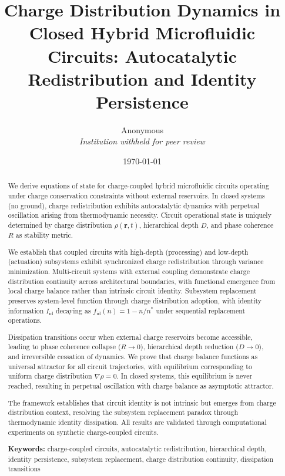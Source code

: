 \documentclass[12pt,a4paper]{article}
\title{\textbf{Charge Distribution Dynamics in Closed Hybrid Microfluidic Circuits: Autocatalytic Redistribution and Identity Persistence}}
\author{
Anonymous\\
\textit{Institution withheld for peer review}
}
\date{\today}
\theoremstyle{plain}
\theoremstyle{definition}
\theoremstyle{remark}
\begin{document}
\maketitle

\begin{abstract}
We derive equations of state for charge-coupled hybrid microfluidic circuits operating under charge conservation constraints without external reservoirs. In closed systems (no ground), charge redistribution exhibits autocatalytic dynamics with perpetual oscillation arising from thermodynamic necessity. Circuit operational state is uniquely determined by charge distribution $\rho(\mathbf{r},t)$, hierarchical depth $D$, and phase coherence $R$ as stability metric.

We establish that coupled circuits with high-depth (processing) and low-depth (actuation) subsystems exhibit synchronized charge redistribution through variance minimization. Multi-circuit systems with external coupling demonstrate charge distribution continuity across architectural boundaries, with functional emergence from local charge balance rather than intrinsic circuit identity. Subsystem replacement preserves system-level function through charge distribution adoption, with identity information $I_{\text{id}}$ decaying as $f_{\text{id}}(n) = 1 - n/n^*$ under sequential replacement operations.

Dissipation transitions occur when external charge reservoirs become accessible, leading to phase coherence collapse ($R \to 0$), hierarchical depth reduction ($D \to 0$), and irreversible cessation of dynamics. We prove that charge balance functions as universal attractor for all circuit trajectories, with equilibrium corresponding to uniform charge distribution $\nabla \rho = 0$. In closed systems, this equilibrium is never reached, resulting in perpetual oscillation with charge balance as asymptotic attractor.

The framework establishes that circuit identity is not intrinsic but emerges from charge distribution context, resolving the subsystem replacement paradox through thermodynamic identity dissipation. All results are validated through computational experiments on synthetic charge-coupled circuits.

\textbf{Keywords:} charge-coupled circuits, autocatalytic redistribution, hierarchical depth, identity persistence, subsystem replacement, charge distribution continuity, dissipation transitions
\end{abstract}
\end{document}
